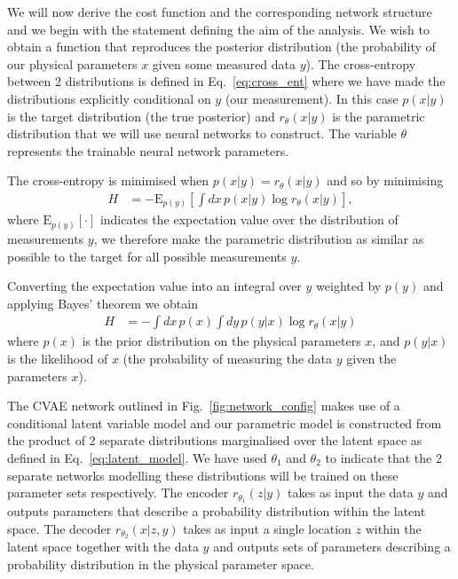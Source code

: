 %
%
We will now derive the cost function and the corresponding network structure
and we begin with the statement defining the aim of the analysis. We wish to
obtain a function that reproduces the posterior distribution (the probability
of our physical parameters $x$ given some measured data $y$). The cross-entropy
between 2 distributions is defined in Eq.~\ref{eq:cross_ent} where we have made
the distributions explicitly conditional on $y$ (our measurement). In this case
$p(x|y)$ is the target distribution (the true posterior) and $r_{\theta}(x|y)$
is the parametric distribution that we will use neural networks to construct.
The variable $\theta$ represents the trainable neural network parameters. 

%
%
The cross-entropy is minimised when $p(x|y)=r_{\theta}(x|y)$ and so by
minimising
%
\begin{align}\label{eq:cost1}
H &= -\text{E}_{p(y)}\left[\int dx\,p(x|y) \log r_{\theta}(x|y)\right],
\end{align}
% 
where $\text{E}_{p(y)}[\cdot]$ indicates the expectation value over the
distribution of measurements $y$, we therefore make the parametric distribution
as similar as possible to the target for all possible measurements $y$.

%
%
Converting the expectation value into an integral over $y$ weighted by $p(y)$
and applying Bayes' theorem we obtain
%
\begin{align}\label{eq:cost1}
H &= -\int dx\,p(x)\int dy\,p(y|x)\log r_{\theta}(x|y)
\end{align}
%
where $p(x)$ is the prior distribution on the physical parameters $x$, and
$p(y|x)$ is the likelihood of $x$ (the probability of measuring the data $y$
given the parameters $x$). 

%
%
The \ac{CVAE} network outlined in Fig.~\ref{fig:network_config} makes use of a
conditional latent variable model and our parametric model is constructed from
the product of 2 separate distributions marginalised over the latent space as
defined in Eq.~\ref{eq:latent_model}. We have used $\theta_{1}$ and
$\theta_{2}$ to indicate that the 2 separate networks modelling these
distributions will be trained on these parameter sets respectively. The
encoder $r_{\theta_1}(z|y)$ takes as input the data $y$ and outputs parameters
that describe a probability distribution within the latent space. The decoder
$r_{\theta_2}(x|z,y)$ takes as input a single location $z$ within the latent
space together with the data $y$ and outputs sets of parameters describing a
probability distribution in the physical parameter space. 

